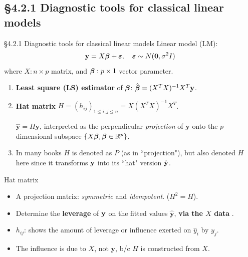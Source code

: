 \documentclass{beamer}
\newcommand{\currentsubsection}{}
\let\oldsubsection\subsection
\renewcommand{\subsection}[1]{\oldsubsection{#1}\renewcommand{\currentsubsection}{#1}}
\newenvironment{wideitemize}%
  {\begin{itemize}%
    \setlength{\parskip}{1em}}%
  {\end{itemize}}
\begin{document}
\subsection{\S4.2.1 Diagnostic tools for classical linear models}
\begin{frame}{\S4.2.1 Diagnostic tools for classical linear models}
Linear model (LM): 
$$\textbf{y}=X\mbox{\boldmath $\beta$}+\mbox{\boldmath $\varepsilon$}, \quad
\mbox{\boldmath $\varepsilon$}\sim N(\textbf{0},\sigma^2I)$$
where $X: n\times p$ matrix, and $\mbox{\boldmath $\beta$}: p\times 1$ vector parameter.
\begin{enumerate}
\item
\textbf{Least square (LS) estimator} of $\mbox{\boldmath $\beta$}$:  
$\hat{\mbox{\boldmath $\beta$}}=(X^TX)^{-1}X^T\textbf{y}$.

\item
\textbf{Hat matrix} $H= (h_{ij})_{1 \leq i , j \leq n} = X(X^TX)^{-1}X^T$. \vspace{8pt}

$\hat{\textbf{y}}=H\textbf{y}$, interpreted as the perpendicular \textit{projection} of $\textbf{y}$ onto the $p$-dimensional subspace
$\{X\mbox{\boldmath $\beta$}, \mbox{\boldmath $\beta$}\in\mathbb{R}^p\}$. \vspace{8pt}
 \item In many books $H$ is denoted as $P$ (as in ``projection"), but also denoted $H$ here since it transforms ${\bf y}$ into its ``hat" version $\hat{\bf y}$.
\end{enumerate}
\end{frame}

\begin{frame}{Hat matrix}
\begin{wideitemize}


\item A projection matrix: \textit{symmetric} and \textit{idempotent}. ($H^2=H$).


\item
Determine the \textbf{leverage} of $\bf y$  on the 
fitted values $\hat{\textbf{y}}$, {\bf via the $X$ data } .
\item
$h_{ij}$:  shows the amount of leverage or influence exerted on $\hat{y}_i$ by $y_j$.


\item The influence is due to $X$,  not $\textbf{y}$, b/c $H$ is constructed from $X$.

 

\end{wideitemize}
\end{frame}
\end{document}
